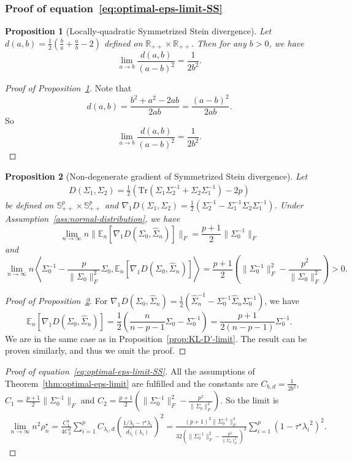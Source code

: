 \documentclass[11pt]{article}
\def\R{\mathbb{R}}
\def\S{\mathbb{S}}
\def\la{\langle}
\def\ra{\rangle}
\newtheorem{proposition}{Proposition}
\newcommand{\bgeqn}{\begin{eqnarray}}
\newcommand{\edeqn}{\end{eqnarray}}
\newcommand{\opt}{^\star}
\def\R{\mathbb{R}}
\def\S{\mathbb{S}}
\def\E {\mathbb{E}}
\def\tr{\mathrm{Tr}}
\def\la{\langle}
\def\PD{{\S^p_{++}}}
\def\ra{\rangle}
\newcommand{\wh}{\widehat}
\begin{document}
\subsubsection{Proof of equation~\eqref{eq:optimal-eps-limit-SS}}
\begin{proposition}[Locally-quadratic Symmetrized Stein divergence]\label{prop:SS-frob-like}
    Let $d(a,b)=\frac{1}{2}(\frac{b}{a}+\frac{a}{b}-2)$ defined on $\R_{++}\times \R_{++}$. Then for any $b>0$, we have 
    \[
        \lim_{a\to b} \frac{d(a,b)}{(a-b)^2} = \frac{1}{2b^2}.
    \]
\end{proposition}
\begin{proof}[Proof of Proposition~\ref{prop:SS-frob-like}]
    Note that 
    \[
        d(a,b) = \frac{b^2+a^2-2ab}{2ab} = \frac{(a-b)^2}{2ab}.
    \]
    So 
    \[
        \lim_{a\to b} \frac{d(a,b)}{(a-b)^2} = \frac{1}{2b^2}.
    \]
\end{proof}
\begin{proposition}[Non-degenerate gradient of Symmetrized Stein divergence]\label{prop:SS-D'-limit}
    Let 
    \bgeqn D(\Sigma_1, \Sigma_2) = \frac{1}{2}\left(\tr(\Sigma_1\Sigma_2^{-1}+\Sigma_2\Sigma_1^{-1})-2p\right)\edeqn 
    be defined on $\PD \times \PD$ and ${\nabla_1 D }(\Sigma_1, \Sigma_2) = \frac{1}{2}\left(\Sigma_2^{-1}-\Sigma_1^{-1}\Sigma_2\Sigma_1^{-1}\right)$. Under Assumption~\ref{ass:normal-distribution}, we have 
    \[
        \lim_{n\to\infty} n\|\E_n[{\nabla_1 D }(\Sigma_0, \wh\Sigma_n)]\|_F = \frac{p+1}{2}\|\Sigma_0^{-1}\|_F
    \]
    and
    \[
    \lim_{n\to\infty} n\left\la \Sigma_0^{-1}-\frac{p}{\|\Sigma_0\|_F^2}\Sigma_0, \E_n [{\nabla_1 D }(\Sigma_0, \wh\Sigma_n)]\right\ra=\frac{p+1}{2}\left(\|\Sigma_0^{-1}\|_F^2-\frac{p^2}{\|\Sigma_0\|_F^2}\right)>0.
    \]
\end{proposition}
\begin{proof}[Proof of Proposition~\ref{prop:SS-D'-limit}]
    For ${\nabla_1 D }(\Sigma_0, \wh\Sigma_n) = \frac{1}{2}\left(\wh\Sigma_n^{-1}-\Sigma_0^{-1}\wh\Sigma_n\Sigma_0^{-1}\right)$, 
    we have 
    \[
        \E_n[{\nabla_1 D }(\Sigma_0, \wh\Sigma_n)] = \frac{1}{2}\left(\frac{n}{n-p-1}\Sigma_0 - \Sigma_0^{-1}\right) = \frac{p+1}{2(n-p-1)}\Sigma_0^{-1}.
    \]
    We are in the same case as in Proposition~\ref{prop:KL-D'-limit}. The result can be proven similarly, and thus we omit the proof.
\end{proof}
\begin{proof}[Proof of equation~\eqref{eq:optimal-eps-limit-SS}]
    All the assumptions of Theorem~\ref{thm:optimal-eps-limit} are fulfilled and the constants are $C_{b,d}=\frac{1}{2b^2}$, $C_1=\frac{p+1}{2}\|\Sigma_0^{-1}\|_F$ and $C_2=\frac{p+1}{2}\left(\|\Sigma_0^{-1}\|_F^2-\frac{p^2}{\|\Sigma_0\|_F^2}\right)$. So the limit is 
    \begin{align*}
        \lim_{n\to\infty} n^2  \rho_n\opt = \frac{C_1^4}{4C_2^2} \sum_{i=1}^p C_{\lambda_i, d} \left(\frac{1/\lambda_i-\tau\opt \lambda_i}{d_{\lambda_i}^{\prime\prime}(\lambda_i)} \right)^2 = \frac{(p+1)^2\|\Sigma_0^{-1}\|_F^4}{32\left(\|\Sigma_0^{-1}\|_F^2-\frac{p^2}{\|\Sigma_0\|_F^2}\right)^2}\sum_{i=1}^p \left(1-\tau\opt {\lambda_i}^2\right)^2.
    \end{align*}
\end{proof}
\end{document}
